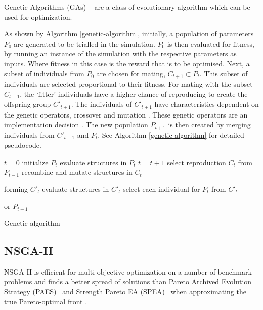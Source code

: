 Genetic Algorithms (GAs) ~\cite{Holland1975} are a class of evolutionary algorithm which can be used for optimization. 

As shown by Algorithm \ref{genetic-algorithm}, initially, a population of parameters $P_{0}$ are generated to be trialled in the simulation. $P_{0}$ is then evaluated for fitness, by running an instance of the simulation with the respective parameters as inputs. Where fitness in this case is the reward that is to be optimised. Next, a subset of individuals from $P_{0}$ are chosen for mating, $C_{t+1} \subset P_{t}$. This subset of individuals are selected proportional to their fitness. For mating with the subset $C_{t+1}$, the `fitter' individuals have a higher chance of reproducing to create the offspring group $C'_{t+1}$. The individuals of $C'_{t+1}$ have characteristics dependent on the genetic operators, crossover and mutation \cite{mitchell1998introduction}. These genetic operators are an implementation decision \cite{FogelDavidB2009}. The new population $P_{t+1}$ is then created by merging individuals from $C'_{t+1}$ and $P_{t}$. See Algorithm \ref{genetic-algorithm} for detailed pseudocode.
%
\begin{algorithm}[t]
	\begin{algorithmic}[1]
		\State $t=0$
		\State initialize $P_{t}$
		\State evaluate structures in $P_{t}$
		\State $t=t+1$
		\State select reproduction $C_{t}$ from $P_{t-1}$
		\State recombine and mutate structures in $C_{t}$
		
		forming $C'_{t}$
		\State evaluate structures in $C'_{t}$
		\State select each individual for $P_{t}$ from $C'_{t}$ 
		
		or $P_{t-1}$
		\EndWhile
		\caption{Genetic algorithm \cite{FogelDavidB2009}}
		\label{genetic-algorithm}
	\end{algorithmic}
\end{algorithm}



\subsection{NSGA-II}


NSGA-II is efficient for multi-objective optimization on a number of benchmark problems and finds a better spread of solutions than Pareto Archived Evolution Strategy (PAES)~\cite{Knowles1999} and Strength Pareto EA (SPEA)~\cite{Zitzler2006} when approximating the true Pareto-optimal front \cite{Valkanas2014}.

